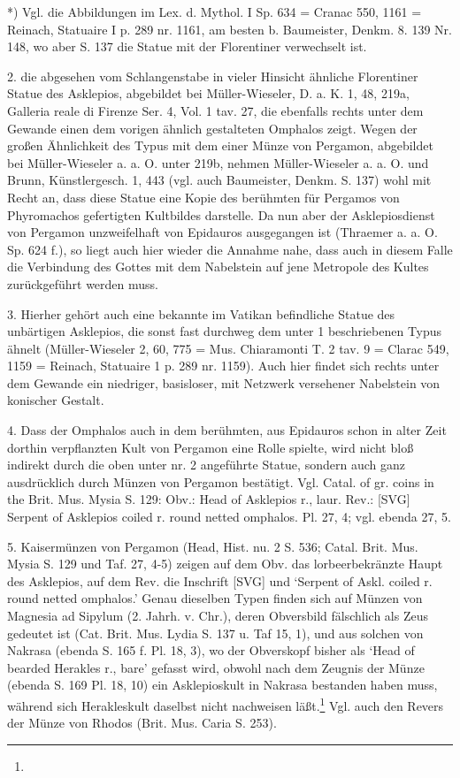 \documentclass[a4paper, 11pt, oneside]{article}
\begin{document}
*) Vgl. die Abbildungen im Lex. d. Mythol. I Sp. 634 = Cranac 550, 1161 = Reinach, Statuaire I p. 289 nr. 1161, am besten b. Baumeister, Denkm. 8. 139 Nr. 148, wo aber S. 137 die Statue mit der Florentiner verwechselt ist.

2. die abgesehen vom Schlangenstabe in vieler Hinsicht ähnliche Florentiner Statue des Asklepios, abgebildet bei Müller-Wieseler, D. a. K. 1, 48, 219a, Galleria reale di Firenze Ser. 4, Vol. 1 tav. 27, die ebenfalls rechts unter dem Gewande einen dem vorigen ähnlich gestalteten Omphalos zeigt. Wegen der großen Ähnlichkeit des Typus mit dem einer Münze von Pergamon, abgebildet bei Müller-Wieseler a. a. O. unter 219b, nehmen Müller-Wieseler a. a. O. und Brunn, Künstlergesch. 1, 443 (vgl. auch Baumeister, Denkm. S. 137) wohl mit Recht an, dass diese Statue eine Kopie des berühmten für Pergamos von Phyromachos gefertigten Kultbildes darstelle. Da nun aber der Asklepiosdienst von Pergamon unzweifelhaft von Epidauros ausgegangen ist (Thraemer a. a. O. Sp. 624 f.), so liegt auch hier wieder die Annahme nahe, dass auch in diesem Falle die Verbindung des Gottes mit dem Nabelstein auf jene Metropole des Kultes zurückgeführt werden muss.

3. Hierher gehört auch eine bekannte im Vatikan befindliche Statue des unbärtigen Asklepios, die sonst fast durchweg dem unter 1 beschriebenen Typus ähnelt (Müller-Wieseler 2, 60, 775 = Mus. Chiaramonti T. 2 tav. 9 = Clarac 549, 1159 = Reinach, Statuaire 1 p. 289 nr. 1159). Auch hier findet sich rechts unter dem Gewande ein niedriger, basisloser, mit Netzwerk versehener Nabelstein von konischer Gestalt.

4. Dass der Omphalos auch in dem berühmten, aus Epidauros schon in alter Zeit dorthin verpflanzten Kult von Pergamon eine Rolle spielte, wird nicht bloß indirekt durch die oben unter nr. 2 angeführte Statue, sondern auch ganz ausdrücklich durch Münzen von Pergamon bestätigt. Vgl. Catal. of gr. coins in the Brit. Mus. Mysia S. 129: Obv.: Head of Asklepios r., laur. Rev.: [SVG] Serpent of Asklepios coiled r. round netted omphalos. Pl. 27, 4; vgl. ebenda 27, 5.

5. Kaisermünzen von Pergamon (Head, Hist. nu. 2 S. 536; Catal. Brit. Mus. Mysia S. 129 und Taf. 27, 4-5) zeigen auf dem Obv. das lorbeerbekränzte Haupt des Asklepios, auf dem Rev. die Inschrift [SVG] und `Serpent of Askl. coiled r. round netted omphalos.' Genau dieselben Typen finden sich auf Münzen von Magnesia ad Sipylum (2. Jahrh. v. Chr.), deren Obversbild fälschlich als Zeus gedeutet ist (Cat. Brit. Mus. Lydia S. 137 u. Taf 15, 1), und aus solchen von Nakrasa (ebenda S. 165 f. Pl. 18, 3), wo der Obverskopf bisher als `Head of bearded Herakles r., bare' gefasst wird, obwohl nach dem Zeugnis der Münze (ebenda S. 169 Pl. 18, 10) ein Asklepioskult in Nakrasa bestanden haben muss, während sich Herakleskult daselbst nicht nachweisen läßt.\footnote{} Vgl. auch den Revers der Münze von Rhodos (Brit. Mus. Caria S. 253).
\end{document}
